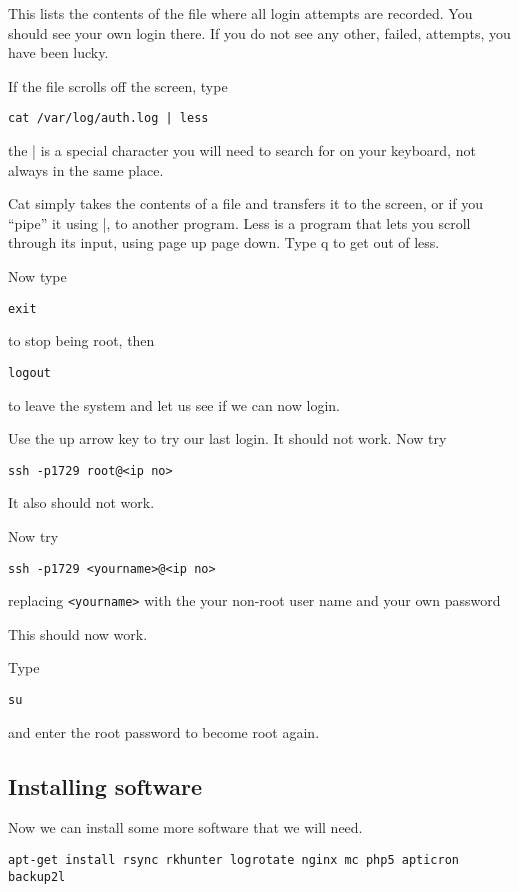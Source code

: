 \documentclass[12pt,a4paper]{article}
\begin{document}
This lists the contents of the file where all login attempts are recorded. You should see your own login there. If you do not see any other, failed, attempts, you have been lucky.

If the file scrolls off the screen, type
\begin{lstlisting}
cat /var/log/auth.log | less
\end{lstlisting}
the | is a special character you will need to search for on your keyboard, not always in the same place.

Cat simply takes the contents of a file and transfers it to the screen, or if you “pipe” it using |, to another program. Less is a program that lets you scroll through its input, using page up page down. Type q to get out of less.  

Now type
\begin{lstlisting}
exit
\end{lstlisting}
to stop being root, then
\begin{lstlisting}
logout
\end{lstlisting}
to leave the system
and let us see if we can now login.

Use the up arrow key to try our last login. It should not work.
Now try

\begin{lstlisting}
ssh -p1729 root@<ip no>
\end{lstlisting}

It also should not work.

Now try
\begin{lstlisting}
ssh -p1729 <yourname>@<ip no>
\end{lstlisting}

replacing \verb|<yourname>| with the your non-root user name and your own password

This should now work.

Type 

\begin{lstlisting}
su
\end{lstlisting}

and enter the root password to become root again.

\subsection*{Installing software}
Now we can install some more software that we will need.
\begin{lstlisting}
apt-get install rsync rkhunter logrotate nginx mc php5 apticron backup2l
\end{lstlisting}
\end{document}
